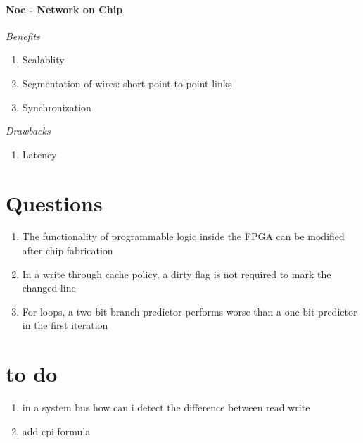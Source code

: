 \documentclass[english]{latex4ei/latex4ei_sheet}
\begin{document}
\paragraph{Noc - Network on Chip}
\textit{Benefits}
\begin{enumerate}
	\item Scalablity
	\item Segmentation of wires: short point-to-point links
	\item Synchronization
\end{enumerate}
\textit{Drawbacks}
\begin{enumerate}
	\item Latency
\end{enumerate}

\section{Questions}

\begin{enumerate}
	\item The functionality of programmable logic inside the FPGA can be modified after chip fabrication
	\item In a write through cache policy, a dirty flag is not required to mark the changed line
	\item For loops, a two-bit branch predictor performs worse than a one-bit predictor in the first iteration

\end{enumerate}

\section{to do}
\begin{enumerate}
	\item in a system bus how can i detect the difference between read write
	\item add cpi formula
\end{enumerate}
\end{document}

